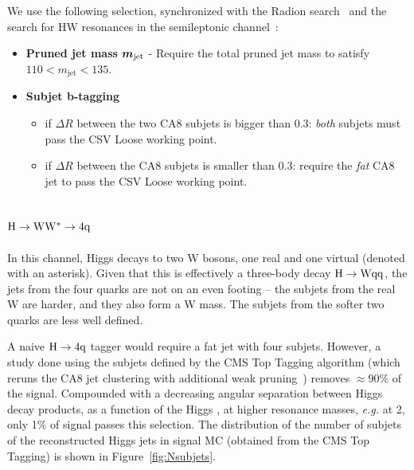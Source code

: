  We use the following selection, synchronized with
the Radion search~\cite{HH4b} and the search for HW 
resonances in the semileptonic channel~\cite{HWlv}:
\begin{itemize}

\item {\bf Pruned jet mass}  $\mbox{\boldmath$m_{\text{jet}}$}$
  - Require the total pruned jet mass to satisfy $110 < m_\text{jet} <  135$\GeVcc.

\item {\bf Subjet b-tagging}
        \begin{itemize}
	\item if $\Delta R$ between the two CA8 subjets is bigger than 0.3: 
  		{\it both} subjets must pass the CSV Loose working point.
	\item if $\Delta R$ between the CA8 subjets is smaller than 0.3:
		require the {\it fat} CA8 jet to pass the CSV Loose working point. 
        \end{itemize}

\end{itemize}



\subsection{${\rm H \to WW^* \to 4q}$}
\label{sec:higgsTaggerww}


In this channel, Higgs decays to two W bosons, one real and one
virtual (denoted with an asterisk).  Given that this is effectively a
three-body decay ${\rm H\to Wqq}$, the jets from the four quarks are
not on an even footing -- the subjets from the real W are harder, and
they also form a W mass.  The subjets from the softer two quarks are
less well defined.

A naive ${\rm H \to 4q}$ tagger would require a fat jet with four subjets. 
However, a study done using the subjets defined by the CMS Top Tagging
algorithm (which reruns the CA8 jet clustering with additional weak 
pruning~\cite{cmstoptagging}) removes $\approx 90\%$ of the signal.   
Compounded with a decreasing angular separation
between Higgs decay products, 
 as a function of the Higgs \pt, at higher 
resonance masses, {\it e.g.} at 2\TeVcc, only 1\% of signal 
passes this selection. 
The distribution of the number of subjets of the reconstructed Higgs jets 
in signal MC (obtained from the CMS Top Tagging) is shown 
in Figure~\ref{fig:Nsubjets}. 

